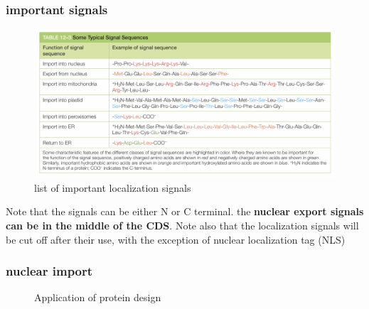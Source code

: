 \documentclass[../main.tex]{subfiles}
\begin{document}
\subsubsection{important signals}
\begin{figure}[H]
    \centering
    \includegraphics[width=\linewidth]{ImportantSignals.png}
    \caption{list of important localization signals}
    \label{fig:enter-label}
\end{figure}
Note that the signals can be either N or C terminal. the \textbf{nuclear export signals can be in the middle of the CDS}. Note also that the localization signals will be cut off after their use, with the exception of nuclear localization tag (\gls{NLS})

\subsubsection{nuclear import}


\begin{figure}[H]
    \centering
    \hspace{0.05\textwidth} %
    \caption{Application of protein design}
    \label{fig:ITC_all}
\end{figure}
\end{document}
